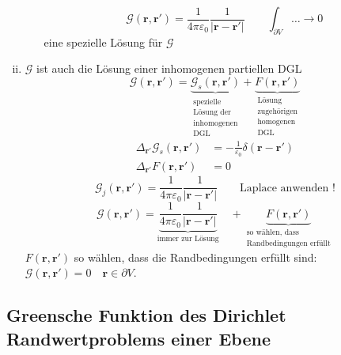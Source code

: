 \documentclass[titlepage,11pt,a4paper,ngerman]{report}
\newcommand{\tx}[1]{\textrm{#1}}
\newcommand{\ub}[1]{\underbrace{#1}}
\newcommand{\gre}{\mathcal{G}}
\newcommand{\kq}{\frac{1}{4\pi\epsilon_0}}
\renewcommand{\vec}[1]{\boldsymbol{#1}}
\renewcommand{\epsilon}{\varepsilon}
\begin{document}
\begin{enumerate}[i)]
\begin{enumerate}[1)]
		\begin{equation*}
		\gre(\vec{r},\vec{r}') = \kq \frac{1}{|\vec{r} - \vec{r}'|} \qquad \int_{\partial V} \dots \rightarrow 0
		\end{equation*}
		eine spezielle Lösung für $ \gre $
	\end{enumerate}
	\item $ \gre $ ist auch die Lösung einer inhomogenen partiellen DGL
	\begin{equation*}
	\gre(\vec{r},\vec{r}') = \ub{\gre_s(\vec{r},\vec{r}')}_{\substack{\tx{spezielle} \\ \tx{Lösung der} \\ \tx{inhomogenen} \\ \tx{DGL}}} + \ub{F(\vec{r},\vec{r}')}_{\substack{\tx{Lösung} \\ \tx{zugehörigen} \\ \tx{homogenen} \\ \tx{DGL}}}
	\end{equation*}
	\begin{align*}
	\Delta_{\vec{r}'} \gre_s(\vec{r},\vec{r}') &= - \frac{1}{\epsilon_0} \delta(\vec{r} - \vec{r}')\\
	\Delta_{\vec{r}'} F(\vec{r},\vec{r}') \, &= 0
	\end{align*}
	\begin{equation*}
	\gre_j(\vec{r},\vec{r}') = \kq \frac{1}{|\vec{r} - \vec{r}'|} \qquad \tx{Laplace anwenden !}
	\end{equation*}
	\begin{equation*}
	\gre(\vec{r},\vec{r}') = \ub{\kq \frac{1}{|\vec{r} - \vec{r}'|}}_{\tx{immer zur Lösung}} \quad + \ub{F(\vec{r},\vec{r}')}_{\substack{\tx{so wählen, dass} \\ \tx{Randbedingungen erfüllt}}}
	\end{equation*}
	$ F(\vec{r},\vec{r}') $ so wählen, dass die Randbedingungen erfüllt sind: $ \gre(\vec{r},\vec{r}') = 0 \quad \vec{r} \in \partial V $.
\end{enumerate}

\subsection{Greensche Funktion des Dirichlet Randwertproblems einer Ebene}
\end{document}
